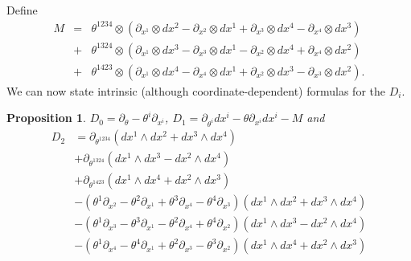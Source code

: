 \documentclass[twoside]{amsart}
\newtheorem{prop}{Proposition}
\newcommand{\enm}[1]{\ensuremath{#1}}
\newcommand{\wdu}[2]{\enm{\partial_{x^{#1}}\otimes dx^{#2}}}
\begin{document}
Define
\begin{eqnarray*}
 M & = & \theta^{1234}\otimes(\wdu{1}{2} - \wdu{2}{1} +
 \wdu{3}{4} - \wdu{4}{3}) \\
 & + & \theta^{1324}\otimes(\wdu{1}{3} - \wdu{3}{1} -
 \wdu{2}{4} + \wdu{4}{2}) \\
 & + & \theta^{1423}\otimes(\wdu{1}{4} - \wdu{4}{1} +
 \wdu{2}{3} - \wdu{3}{2}).
\end{eqnarray*}
We can now state intrinsic (although coordinate-dependent) formulas
for the \( D_{i} \).

\begin{prop} \( D_{0} = \partial_{\theta} -
\theta^{i}\partial_{x^{i}}
\),
\( D_{1} = \partial_{\theta^{i}}dx^{i} - \theta\partial_{x^{i}}
dx^{i} - M \) and
\begin{align*}
    D_{2} & = \partial_{\theta^{1234}}
    (dx^{1}\wedge dx^{2}+dx^{3}\wedge dx^{4}) \\
    & + \partial_{\theta^{1324}}
    (dx^{1}\wedge dx^{3}-dx^{2}\wedge dx^{4}) \\
    & + \partial_{\theta^{1423}}
    (dx^{1}\wedge dx^{4}+dx^{2}\wedge dx^{3}) \\
    & - (\theta^{1}\partial_{x^{2}} - \theta^{2}\partial_{x^{1}}
    +\theta^{3}\partial_{x^{4}} - \theta^{4}\partial_{x^{3}})
    (dx^{1}\wedge dx^{2}+dx^{3}\wedge dx^{4}) \\
    & - (\theta^{1}\partial_{x^{3}} - \theta^{3}\partial_{x^{1}}
    -\theta^{2}\partial_{x^{4}} + \theta^{4}\partial_{x^{2}})
    (dx^{1}\wedge dx^{3}-dx^{2}\wedge dx^{4}) \\
    & - (\theta^{1}\partial_{x^{4}} - \theta^{4}\partial_{x^{1}}
    +\theta^{2}\partial_{x^{3}} - \theta^{3}\partial_{x^{2}})
    (dx^{1}\wedge dx^{4}+dx^{2}\wedge dx^{3})
\end{align*}
\end{prop}
\end{document}
